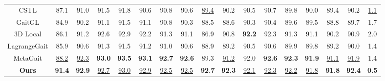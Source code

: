 \begin{table}[tbp]
{\begin{tabular}{c|cccccccccccccc|c|c}
            CSTL \cite{huang2021context}         & 87.1                             & 91.0                     & 91.5                    & 91.8             & 90.6             & 90.8             & 90.6             & \underline{89.4} & 90.2             & 90.5             & 90.7             & 89.8             & 90.0             & 89.4             & 90.2             & \underline{1.1} \\

            GaitGL \cite{lin2021gait}            & 84.9                             & 90.2                     & 91.1                    & 91.5             & 91.1             & 90.8             & 90.3             & 88.5             & 88.6             & 90.3             & 90.4             & 89.6             & 89.5             & 88.8             & 89.7             & 1.7             \\

            3D Local \cite{huang20213d}          & 86.1                             & 91.2                     & 92.6                    & 92.9             & 92.2             & 91.3             & 91.1             & 86.9             & 90.8             & \textbf{92.2}    & 92.3             & 91.3             & 91.1             & 90.2             & 90.9             & 2.0             \\

            LagrangeGait \cite{chai2022lagrange} & 85.9                             & 90.6                     & 91.3                    & 91.5             & 91.2             & 91.0             & 90.6             & 88.9             & 89.2             & 90.5             & 90.6             & 89.9             & 89.8             & 89.2             & 90.0             & 1.4             \\

            MetaGait \cite{dou2022metagait}      & \underline{88.2}                 & \underline{92.3}         & \textbf{93.0}           & \textbf{93.5}    & \textbf{93.1}    & \textbf{92.7}    & \textbf{92.6}    & 89.3             & \underline{91.2} & 92.0             & \textbf{92.6}    & \textbf{92.3}    & \textbf{91.9}    & \underline{91.1} & \underline{91.9} & 1.4             \\
            \hline
            \textbf{Ours}                        & \textbf{91.4}                    & \textbf{92.9}            & \underline{92.7}        & \underline{93.0} & \underline{92.9} & \underline{92.5} & \underline{92.5} & \textbf{92.7}    & \textbf{92.3}    & \underline{92.1} & \underline{92.3} & \underline{92.2} & \underline{91.8} & \textbf{91.8}    & \textbf{92.4}    & \textbf{0.5}    \\
            \bottomrule
        \end{tabular}%
        \label{tab:sota-ou}%
    }
\end{table}%


